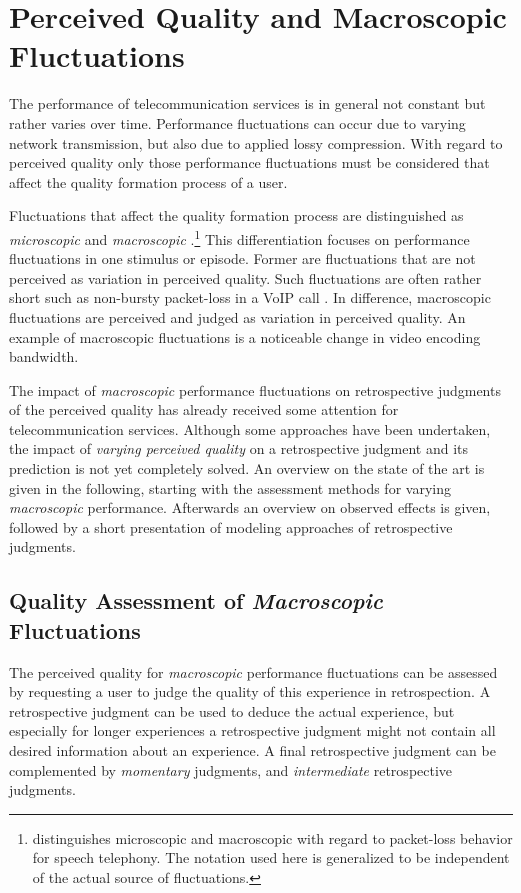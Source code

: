 \section{Perceived Quality and Macroscopic Fluctuations}\label{chap:04}
The performance of telecommunication services is in general not constant but rather varies over time.
Performance fluctuations can occur due to varying network transmission, but also due to applied lossy compression.
With regard to perceived quality only those performance fluctuations must be considered that affect the quality formation process of a user.

Fluctuations that affect the quality formation process are distinguished as \emph{microscopic} and \emph{macroscopic} \citep[][p.\,72]{raake_short-_2006}.\footnote{\citet{raake_short-_2006} distinguishes microscopic and macroscopic with regard to packet-loss behavior for speech telephony. The notation used here is generalized to be independent of the actual source of fluctuations.}
This differentiation focuses on performance fluctuations in one stimulus or episode.
Former are fluctuations that are not perceived as variation in perceived quality.
Such fluctuations are often rather short such as non-bursty packet-loss in a \ac{VoIP} call \citep[\cf,][p.\,72]{raake_short-_2006}.
In difference, macroscopic fluctuations are perceived and judged as variation in perceived quality.
An example of macroscopic fluctuations is a noticeable change in video encoding bandwidth.

The impact of \emph{macroscopic} performance fluctuations on retrospective judgments of the perceived quality has already received some attention for telecommunication services.
Although some approaches have been undertaken, the impact of \emph{varying perceived quality} on a retrospective judgment and its prediction is not yet completely solved.
An overview on the state of the art is given in the following, starting with the assessment methods for varying \emph{macroscopic} performance.
Afterwards an overview on observed effects is given, followed by a short presentation of modeling approaches of retrospective judgments.

\subsection{Quality Assessment of \emph{Macroscopic} Fluctuations}
The perceived quality for \emph{macroscopic} performance fluctuations can be assessed by requesting a user to judge the quality of this experience in retrospection.
A retrospective judgment can be used to deduce the actual experience, but especially for longer experiences a retrospective judgment might not contain all desired information about an experience.
A final retrospective judgment can be complemented by \emph{momentary} judgments, and \emph{intermediate} retrospective judgments.

